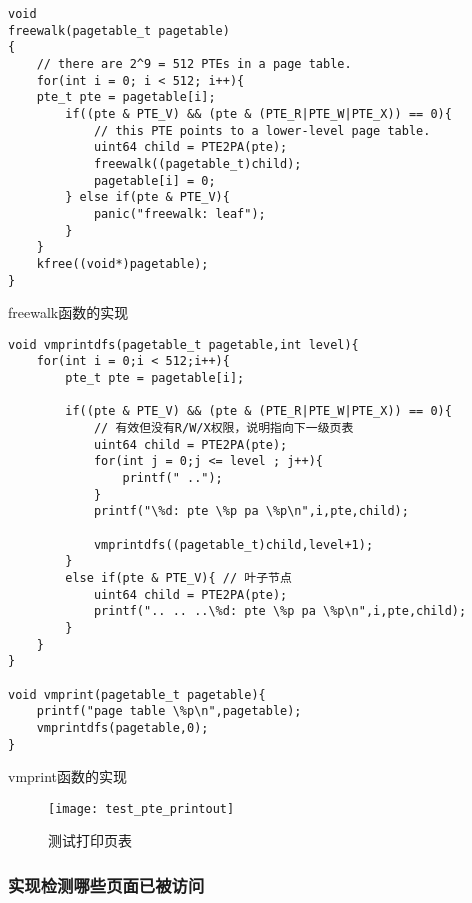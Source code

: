 {\begin{listing}[!htb]
	\begin{verbatim}
void
freewalk(pagetable_t pagetable)
{
    // there are 2^9 = 512 PTEs in a page table.
    for(int i = 0; i < 512; i++){
    pte_t pte = pagetable[i];
        if((pte & PTE_V) && (pte & (PTE_R|PTE_W|PTE_X)) == 0){
            // this PTE points to a lower-level page table.
            uint64 child = PTE2PA(pte);
            freewalk((pagetable_t)child);
            pagetable[i] = 0;
        } else if(pte & PTE_V){
            panic("freewalk: leaf");
        }
    }
    kfree((void*)pagetable);
}
	\end{verbatim}
	\caption{freewalk函数的实现}\label{lst:freewalk}
\end{listing}

\begin{listing}[!htb]
	\begin{verbatim}
void vmprintdfs(pagetable_t pagetable,int level){
    for(int i = 0;i < 512;i++){
        pte_t pte = pagetable[i];
         
        if((pte & PTE_V) && (pte & (PTE_R|PTE_W|PTE_X)) == 0){
            // 有效但没有R/W/X权限，说明指向下一级页表
            uint64 child = PTE2PA(pte);
            for(int j = 0;j <= level ; j++){
                printf(" ..");
            }
            printf("\%d: pte \%p pa \%p\n",i,pte,child);

            vmprintdfs((pagetable_t)child,level+1);
        }
        else if(pte & PTE_V){ // 叶子节点
            uint64 child = PTE2PA(pte);
            printf(".. .. ..\%d: pte \%p pa \%p\n",i,pte,child);
        }
    }
}

void vmprint(pagetable_t pagetable){
    printf("page table \%p\n",pagetable);
    vmprintdfs(pagetable,0);
}
	\end{verbatim}
	\caption{vmprint函数的实现}\label{lst:vmprint}
\end{listing}

\begin{figure}[!htb]
	\centering
	\texttt{[image: test\_pte\_printout]}
	\caption{测试打印页表}
	\label{fig:test_pte_printout}
\end{figure}

\subsubsection{实现检测哪些页面已被访问}

}
